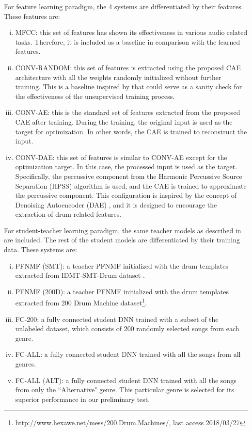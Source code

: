 \documentclass{article}
\begin{document}
For feature learning paradigm, the 4 systems are differentiated by their features. These features are: 
\begin{enumerate}[(i)]
\item MFCC: this set of features has shown its effectiveness in various audio related tasks. Therefore, it is included as a baseline in comparison with the learned features.   
\item CONV-RANDOM: this set of features is extracted using the proposed CAE architecture with all the weights randomly initialized without further training. This is a baseline inspired by \cite{Choi2017a} that could serve as a sanity check for the effectiveness of the unsupervised training process.  
\item CONV-AE: this is the standard set of features extracted from the proposed CAE after training. During the training, the original input is used as the target for optimization. In other words, the CAE is trained to reconstruct the input. 
\item CONV-DAE: this set of features is similar to CONV-AE except for the optimization target. In this case, the processed input is used as the target. Specifically, the percussive component from the Harmonic Percussive Source Separation (HPSS) \cite{Fitzgerald2010} algorithm is used, and the CAE is trained to approximate the percussive component. This configuration is inspired by the concept of Denoising Autoencoder (DAE) \cite{Vincent2008}, and it is designed to encourage the extraction of drum related features. 
\end{enumerate}

For student-teacher learning paradigm, the same teacher models as described in \cite{Wu2017} are included. The rest of the student models are differentiated by their training data. These systems are: 
\begin{enumerate}[(i)]
\item PFNMF (SMT): a teacher PFNMF initialized with the drum templates extracted from IDMT-SMT-Drum dataset \cite{DittmarG14_DrumTranscription_DAFX}.
\item PFNMF (200D): a teacher PFNMF initialized with the drum templates extracted from 200 Drum Machine dataset\footnote{http://www.hexawe.net/mess/200.Drum.Machines/, last access 2018/03/27}.
\item FC-200: a fully connected student DNN trained with a subset of the unlabeled dataset, which consists of 200 randomly selected songs from each genre. 
\item FC-ALL: a fully connected student DNN trained with all the songs from all genres.
\item FC-ALL (ALT): a fully connected student DNN trained with all the songs from only the ``Alternative" genre. This particular genre is selected for its superior performance in our preliminary test. 
\end{enumerate}
\end{document}
